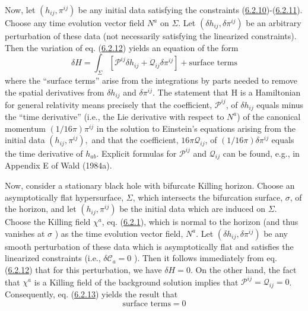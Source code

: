 \documentclass[11pt,a4paper]{article}
\begin{document}
Now, let \((h_{ij}, \pi^{ij})\) be any initial data satisfying the constraints (\hyperref[eq:6.2.10]{6.2.10})-(\hyperref[eq:6.2.11]{6.2.11}). Choose any time evolution vector field \(N^a\) on \(\Sigma\). Let \((\delta h_{ij}, \delta \pi^{ij})\) be an arbitrary perturbation of these data (not necessarily satisfying the linearized constraints). Then the variation of eq. (\hyperref[eq:6.2.12]{6.2.12}) yields an equation of the form
\begin{equation*}
\delta H=\int_\Sigma[\mathcal P^{ij}\delta h_{ij}+\mathcal Q_{ij}\delta\pi^{ij}]+\text{surface terms} \tag{6.2.13}\label{eq:6.2.13}
\end{equation*}
where the ``surface terms'' arise from the integrations by parts needed to remove the spatial derivatives from \(\delta h_{ij}\) and \(\delta \pi^{ij}\). The statement that H is a Hamiltonian for general relativity means precisely that the coefficient, \(\mathcal{P}^{ij}\), of \(\delta h_{ij}\) equals minus the ``time derivative'' (i.e., the Lie derivative with respect to \(N^a\)) of the canonical momentum \((1/16\pi)\pi^{ij}\) in the solution to Einstein's equations arising from the initial data \((h_{ij},\pi^{ij}),\) and that the coefficient, \(16\pi \mathcal Q_{ij}\), of \((1/16\pi)\delta\pi^{ij}\) equals the time derivative of \(h_{ab}.\) Explicit formulas for \(\mathcal{P}^{ij}\) and \(\mathcal Q_{ij}\) can be found, e.g., in Appendix E of Wald (1984a).

Now, consider a stationary black hole with bifurcate Killing horizon. Choose an asymptotically flat hypersurface, \(\Sigma\), which intersects the bifurcation surface, \(\sigma\), of the horizon, and let \((h_{ij}, \pi^{ij})\) be the initial data which are induced on \(\Sigma\). Choose the Killing field \(\chi^a\), eq. (\hyperref[eq:6.2.1]{6.2.1}), which is normal to the horizon (and thus vanishes at \(\sigma\) ) as the time evolution vector field, \(N^a\). Let \((\delta h_{ij}, \delta \pi^{ij})\) be any smooth perturbation of these data which is asymptotically flat and satisfies\hypertarget{source-158}{} the linearized constraints (i.e., \(\delta \mathcal{C}_a = 0\) ). Then it follows immediately from eq. (\hyperref[eq:6.2.12]{6.2.12}) that for this perturbation, we have \(\delta H = 0\). On the other hand, the fact that \(\chi^a\) is a Killing field of the background solution implies that \(\mathcal{P}^{ij} = \mathcal Q_{ij} = 0\). Consequently, eq. (\hyperref[eq:6.2.13]{6.2.13}) yields the result that
\begin{equation*}
\text{surface terms}=0 \tag{6.2.14}\label{eq:6.2.14}
\end{equation*}
\end{document}
